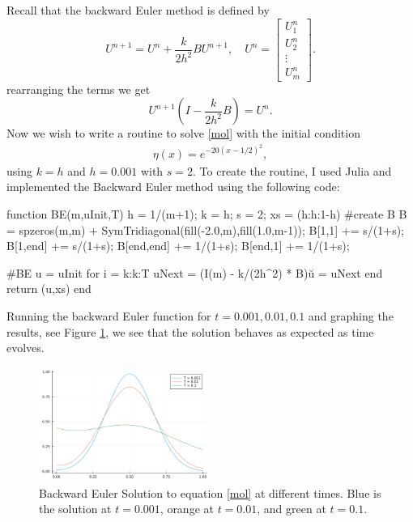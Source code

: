 \documentclass[12pt]{report}
\begin{document}
\begin{solution}

  \noindent
  Recall that the backward Euler method is defined by
  \[ 
    U^{n+1} = U^n + \frac{k}{2h^2} B U^{n+1}, \quad U^n = \begin{bmatrix} U_1^n \\ U_2^n \\ \vdots \\U_m^n \end{bmatrix}.
  \] 
  rearranging the terms we get
  \[ 
    U^{n+1}\left( I - \frac{k}{2h^2}B \right) = U^n.
  \]
  Now we wish to write a routine to solve \eqref{mol} with the initial condition
  \begin{align*}
    \eta(x) = e^{-20(x-1/2)^2},
  \end{align*}
  using $k = h$ and $h = 0.001$ with $s = 2$. To create the routine, I used Julia and implemented the Backward Euler method using the following code:
  \begin{python}
  function BE(m,uInit,T)
    h = 1/(m+1);
    k = h;
    s = 2;
    xs = (h:h:1-h)
    #create B
    B =  spzeros(m,m) + SymTridiagonal(fill(-2.0,m),fill(1.0,m-1));
    B[1,1] += s/(1+s);
    B[1,end] += s/(1+s);
    B[end,end] += 1/(1+s);
    B[end,1] += 1/(1+s);


    #BE
    u = uInit
    for i = k:k:T
        uNext = (I(m) - k/(2h^2) * B)\u
        u = uNext
    end
    return (u,xs)
  end
  \end{python}
  Running the backward Euler function for $t = 0.001,0.01,0.1$ and graphing the results, see Figure \ref{fig1}, we see that the solution behaves as expected as time evolves. 
  \begin{figure}[H]
    \centering
    \includegraphics[width=0.5\textwidth,height=\textwidth,keepaspectratio]{images/2.png}
    \caption{Backward Euler Solution to equation \eqref{mol} at different times. Blue is the solution at $t=0.001$, orange at $t=0.01$, and green at $t=0.1$.}
    \label{fig1}
  \end{figure}


\end{solution}
\end{document}
